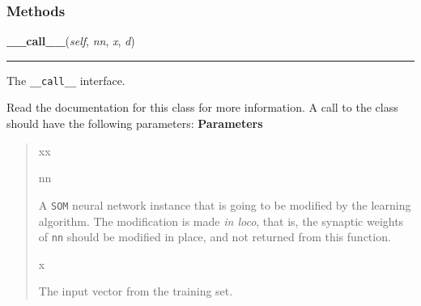 
  \subsubsection{Methods}

    \label{peach:nn:lrules:SOMLearning:__call__}

    \vspace{0.5ex}

\hspace{.8\funcindent}\begin{boxedminipage}{\funcwidth}

    \raggedright \textbf{\_\_call\_\_}(\textit{self}, \textit{nn}, \textit{x}, \textit{d})

    \vspace{-1.5ex}

    \rule{\textwidth}{0.5\fboxrule}
\setlength{\parskip}{2ex}

The \texttt{\_\_call\_\_} interface.

Read the documentation for this class for more information. A call to
the class should have the following parameters:
\setlength{\parskip}{1ex}
      \textbf{Parameters}
      \vspace{-1ex}

      \begin{quote}
        \begin{Ventry}{xx}

          \item[nn]


A \texttt{SOM} neural network instance that is going to be modified by
the learning algorithm. The modification is made \emph{in loco}, that is,
the synaptic weights of \texttt{nn} should be modified in place, and not
returned from this function.
          \item[x]


The input vector from the training set.
        \end{Ventry}

      \end{quote}

    \end{boxedminipage}


